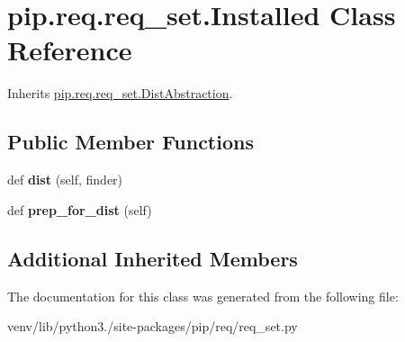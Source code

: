 \hypertarget{classpip_1_1req_1_1req__set_1_1_installed}{}\section{pip.\+req.\+req\+\_\+set.\+Installed Class Reference}
\label{classpip_1_1req_1_1req__set_1_1_installed}


Inherits \hyperlink{classpip_1_1req_1_1req__set_1_1_dist_abstraction}{pip.\+req.\+req\+\_\+set.\+Dist\+Abstraction}.

\subsection*{Public Member Functions}
\begin{DoxyCompactItemize}
\item 
\mbox{\label{classpip_1_1req_1_1req__set_1_1_installed_a54952c519b563fff3c1e17e4515e289b}} 
def {\bfseries dist} (self, finder)
\item 
\mbox{\label{classpip_1_1req_1_1req__set_1_1_installed_a49f1ed0844d6386ffd338a37a3b97cd5}} 
def {\bfseries prep\+\_\+for\+\_\+dist} (self)
\end{DoxyCompactItemize}
\subsection*{Additional Inherited Members}


The documentation for this class was generated from the following file\+:\begin{DoxyCompactItemize}
\item 
venv/lib/python3./site-\/packages/pip/req/req\+\_\+set.\+py\end{DoxyCompactItemize}
